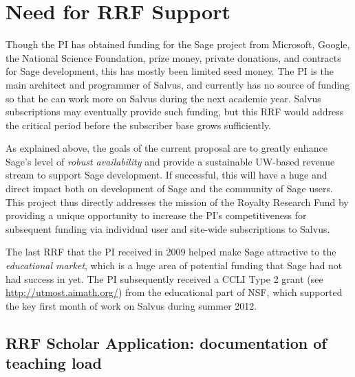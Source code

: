 \documentclass[11pt]{article}
\begin{document}
\section{Need for RRF Support}

Though the PI has obtained funding for the Sage project from
Microsoft, Google, the National Science Foundation, prize money,
private donations, and contracts for Sage development, this has mostly
been limited seed money.  The PI is the main architect and programmer
of Salvus, and currently has no source of funding so that he can work
more on Salvus during the next academic year.  Salvus subscriptions
may eventually provide such funding, but this RRF would address the
critical period before the subscriber base grows sufficiently.


As explained above, the goals of the current proposal are to greatly enhance Sage's level
of {\em robust availability} and provide a sustainable UW-based
revenue stream to support Sage development.  If successful, this will
have a huge and direct impact both on development of Sage and the
community of Sage users.  This project thus directly addresses the
mission of the Royalty Research Fund by providing a unique opportunity
to increase the PI's competitiveness for subsequent funding via
individual user and site-wide subscriptions to Salvus.

The last RRF that the PI received in 2009 helped make Sage attractive
to the {\em educational market}, which is a huge area of potential
funding that Sage had not had success in yet.  The PI subsequently
received a CCLI Type 2 grant (see
\url{http://utmost.aimath.org/}) from the educational part of NSF,
which supported the key first month of work on Salvus during summer 2012.

\subsection{RRF Scholar Application: documentation of teaching load}

\end{document}
